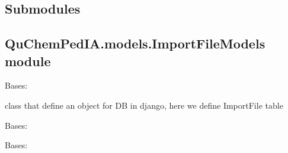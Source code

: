 \documentclass[letterpaper,10pt,english]{sphinxmanual}
\begin{document}
\subsection{Submodules}
\label{\detokenize{QuChemPedIA.models:submodules}}

\subsection{QuChemPedIA.models.ImportFileModels module}
\label{\detokenize{QuChemPedIA.models:module-QuChemPedIA.models.ImportFileModels}}\label{\detokenize{QuChemPedIA.models:quchempedia-models-importfilemodels-module}}

\begin{fulllineitems}
\label{\detokenize{QuChemPedIA.models:QuChemPedIA.models.ImportFileModels.ImportFile}}
Bases: 

class that define an object for DB in django, here we define ImportFile table

\begin{fulllineitems}
\label{\detokenize{QuChemPedIA.models:QuChemPedIA.models.ImportFileModels.ImportFile.DoesNotExist}}
Bases: 

\end{fulllineitems}


\begin{fulllineitems}
\label{\detokenize{QuChemPedIA.models:QuChemPedIA.models.ImportFileModels.ImportFile.MultipleObjectsReturned}}
Bases: 

\end{fulllineitems}



\end{fulllineitems}
\end{document}
